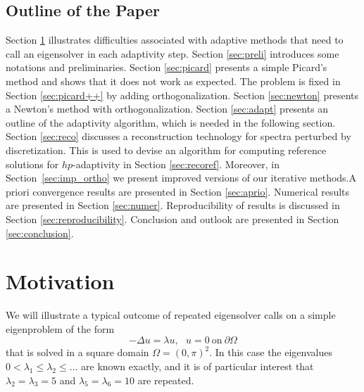 \documentclass[preprint,12pt]{elsarticle}
\begin{document}

\subsection{Outline of the Paper}

Section \ref{sec:motiv} illustrates difficulties associated with 
adaptive methods that need to call an eigensolver in each adaptivity 
step. Section \ref{sec:preli} introduces some notations and 
preliminaries. Section \ref{sec:picard} presents a simple
Picard's method and shows that it does not work as expected.
The problem is fixed in Section \ref{sec:picard++} by adding 
orthogonalization. Section \ref{sec:newton} presents 
a Newton's method with orthogonalization. 
Section \ref{sec:adapt} presents an outline of the adaptivity algorithm,
which is needed in the following section.
Section \ref{sec:reco}
discusses a reconstruction technology for spectra perturbed 
by discretization. This is used to devise an algorithm for 
computing reference solutions for $hp$-adaptivity in 
Section \ref{sec:recoref}. 
Moreover, in Section~\ref{sec:imp_ortho} we present improved versions of our iterative methods.A priori convergence results 
are presented in Section \ref{sec:aprio}. Numerical results 
are presented in Section \ref{sec:numer}. Reproducibility of 
results is discussed in Section \ref{sec:reproducibility}.
Conclusion and outlook are presented in Section \ref{sec:conclusion}.


\section{Motivation}\label{sec:motiv}

We will illustrate a typical outcome of repeated eigensolver calls
on a simple eigenproblem of the form 
\begin{equation} \label{one}
-\Delta u = \lambda u, \ \ \ u = 0 \ \mbox{on} \ \partial \Omega
\end{equation}
that is solved in a square domain $\Omega = (0, \pi)^2$.
In this case the eigenvalues $0 < \lambda_1 \le \lambda_2 \le \ldots$ 
are known exactly, and it is of particular interest that $\lambda_2 = \lambda_3 = 5$ 
and $\lambda_5 = \lambda_6 = 10$ are repeated. 
\end{document}
